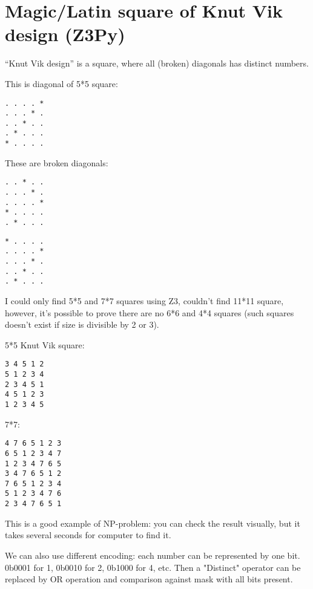\section{Magic/Latin square of Knut Vik design (Z3Py)}

``Knut Vik design'' is a square, where all (broken) diagonals has distinct numbers.

This is diagonal of 5*5 square:

\begin{lstlisting}
. . . . *
. . . * .
. . * . .
. * . . .
* . . . .
\end{lstlisting}

These are broken diagonals:

\begin{lstlisting}
. . * . .
. . . * .
. . . . *
* . . . .
. * . . .
\end{lstlisting}

\begin{lstlisting}
* . . . .
. . . . *
. . . * .
. . * . .
. * . . .
\end{lstlisting}

I could only find 5*5 and 7*7 squares using Z3, couldn't find 11*11 square, however, it's possible to prove there are no 6*6 and 4*4 squares (such squares doesn't exist if size is divisible by 2 or 3).



5*5 Knut Vik square:

\begin{lstlisting}
3 4 5 1 2
5 1 2 3 4
2 3 4 5 1
4 5 1 2 3
1 2 3 4 5
\end{lstlisting}

7*7:

\begin{lstlisting}
4 7 6 5 1 2 3
6 5 1 2 3 4 7
1 2 3 4 7 6 5
3 4 7 6 5 1 2
7 6 5 1 2 3 4
5 1 2 3 4 7 6
2 3 4 7 6 5 1
\end{lstlisting}

This is a good example of NP-problem: you can check the result visually, but it takes several seconds for computer to find it.

We can also use different encoding: each number can be represented by one bit. 0b0001 for 1, 0b0010 for 2, 0b1000 for 4, etc.
Then a "Distinct" operator can be replaced by OR operation and comparison against mask with all bits present.



